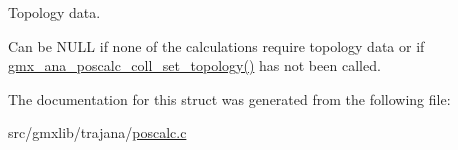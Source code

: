 \-Topology data. 

\-Can be \-N\-U\-L\-L if none of the calculations require topology data or if \hyperlink{include_2poscalc_8h_a6cf24df8a8ad3800ca4860cbe513810f}{gmx\-\_\-ana\-\_\-poscalc\-\_\-coll\-\_\-set\-\_\-topology()} has not been called. 

\-The documentation for this struct was generated from the following file\-:\begin{DoxyCompactItemize}
\item 
src/gmxlib/trajana/\hyperlink{poscalc_8c}{poscalc.\-c}\end{DoxyCompactItemize}
